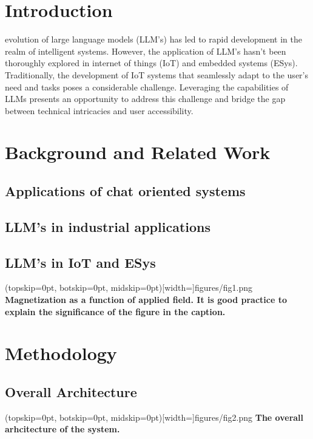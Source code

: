\documentclass{ieeeaccess}
\begin{document}
\maketitle

\section{Introduction}
\label{sec:introduction}
 evolution of large language models (LLM's) has led to rapid
development in the  realm of intelligent systems. However, the application of
LLM's hasn't been thoroughly explored in internet of things (IoT) and embedded
systems (ESys). Traditionally, the development of IoT systems that seamlessly
adapt to the user's need and tasks poses a considerable challenge. Leveraging
the capabilities of LLMs presents an opportunity to address this challenge and
bridge the gap between technical intricacies and user accessibility.
\section{Background and Related Work}

\subsection{Applications of chat oriented systems}
\subsection{LLM's in industrial applications}
\subsection{LLM's in IoT and ESys}

\Figure[t!](topskip=0pt, botskip=0pt, midskip=0pt)[width=\textwidth]{{figures/fig1.png}}
{ \textbf{Magnetization as a function of applied field.
It is good practice to explain the significance of the figure in the caption.}\label{fig1}}

\section{Methodology}

\subsection{Overall Architecture}
\Figure[t!](topskip=0pt, botskip=0pt,
midskip=0pt)[width=\textwidth]{{figures/fig2.png}}
{ \textbf{The overall arhcitecture of the system.}\label{fig1}}
\end{document}

